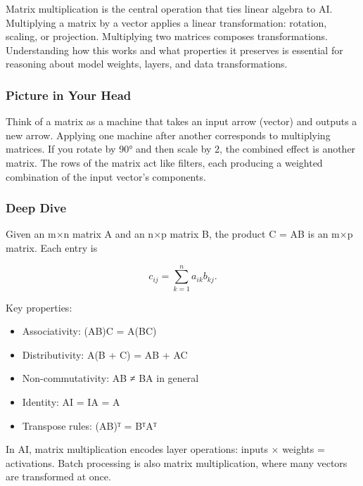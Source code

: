 \documentclass[
  letterpaper,
  DIV=11,
  numbers=noendperiod]{scrreprt}
\providecommand{\tightlist}{%
  \setlength{\itemsep}{0pt}\setlength{\parskip}{0pt}}
\begin{document}
Matrix multiplication is the central operation that ties linear algebra
to AI. Multiplying a matrix by a vector applies a linear transformation:
rotation, scaling, or projection. Multiplying two matrices composes
transformations. Understanding how this works and what properties it
preserves is essential for reasoning about model weights, layers, and
data transformations.

\subsubsection{Picture in Your Head}\label{picture-in-your-head-102}

Think of a matrix as a machine that takes an input arrow (vector) and
outputs a new arrow. Applying one machine after another corresponds to
multiplying matrices. If you rotate by 90° and then scale by 2, the
combined effect is another matrix. The rows of the matrix act like
filters, each producing a weighted combination of the input vector's
components.

\subsubsection{Deep Dive}\label{deep-dive-102}

Given an m×n matrix A and an n×p matrix B, the product C = AB is an m×p
matrix. Each entry is

\[
c_{ij} = \sum_{k=1}^{n} a_{ik} b_{kj}.
\]

Key properties:

\begin{itemize}
\tightlist
\item
  Associativity: (AB)C = A(BC)
\item
  Distributivity: A(B + C) = AB + AC
\item
  Non-commutativity: AB ≠ BA in general
\item
  Identity: AI = IA = A
\item
  Transpose rules: (AB)ᵀ = BᵀAᵀ
\end{itemize}

In AI, matrix multiplication encodes layer operations: inputs × weights
= activations. Batch processing is also matrix multiplication, where
many vectors are transformed at once.
\end{document}
